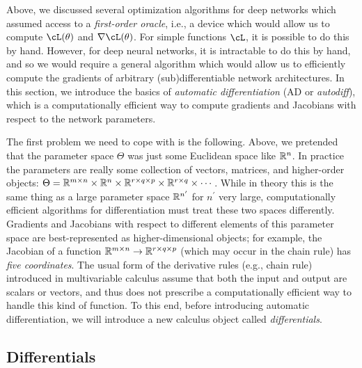 \documentclass[../../book-main.tex]{subfiles}
\begin{document}
Above, we discussed several optimization algorithms for deep networks which assumed access to a \textit{first-order oracle}, i.e., a device which would allow us to compute \(\cL(\theta)\) and \(\nabla \cL(\theta)\). For simple functions \(\cL\), it is possible to do this by hand. However, for deep neural networks, it is intractable to do this by hand, and so we would require a general algorithm which would allow us to efficiently compute the gradients of arbitrary (sub)differentiable network architectures. In this section, we introduce the basics of \textit{automatic differentiation} (AD or \textit{autodiff}), which is a computationally efficient way to compute gradients and Jacobians with respect to the network parameters.

The first problem we need to cope with is the following. Above, we pretended that the parameter space \(\Theta\) was just some Euclidean space like \(\mathbb{R}^{n}\). In practice the parameters are really some collection of vectors, matrices, and higher-order objects: \(\Theta = \mathbb{R}^{m \times n} \times \mathbb{R}^{n} \times \mathbb{R}^{r \times q \times p} \times \mathbb{R}^{r \times q} \times \cdots\). While in theory this is the same thing as a large parameter space \(\mathbb{R}^{n^{\prime}}\) for \(n^{\prime}\) very large, computationally efficient algorithms for differentiation must treat these two spaces differently. Gradients and Jacobians with respect to different elements of this parameter space are best-represented as higher-dimensional objects; for example, the Jacobian of a function \(\mathbb{R}^{m \times n} \to \mathbb{R}^{r \times q \times p}\) (which may occur in the chain rule) has \textit{five coordinates}. The usual form of the derivative rules (e.g., chain rule) introduced in multivariable calculus assume that both the input and output are scalars or vectors, and thus does not prescribe a computationally efficient way to handle this kind of function. To this end, before introducing automatic differentiation, we will introduce a new calculus object called \textit{differentials}. 

\subsection{Differentials}
\end{document}
